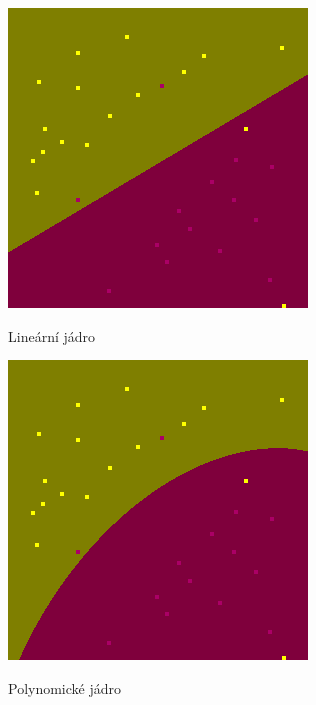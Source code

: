 \begin{figure}[H] 
\centering
  \begin{minipage}[b]{0.4\linewidth}
    \centering
    \includegraphics[width=.7\linewidth]{figures/linear} 
    \caption*{Lineární jádro} 
    \vspace{4ex}
    \label{linearKernel} 
  \end{minipage}%
  \begin{minipage}[b]{0.4\linewidth}
    \centering
    \includegraphics[width=.7\linewidth]{figures/poly} 
    \caption*{Polynomické jádro} 
    \vspace{4ex}
    \label{polyKernel} 
  \end{minipage} 
  \begin{minipage}[b]{0.4\linewidth}
    \centering

\end{minipage}
\end{figure}
